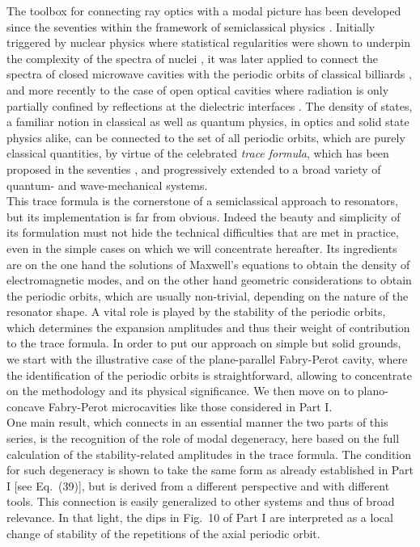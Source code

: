 \documentclass[10pt]{iopart}
\begin{document}
The toolbox for connecting ray optics with a modal picture has been developed since the seventies within the framework of semiclassical physics \cite{brack}. Initially triggered by nuclear physics where statistical regularities were shown to underpin the complexity of the spectra of nuclei \cite{bohigas}, it was later applied to connect the spectra of closed microwave cavities with the periodic orbits of classical billiards \cite{graf1992}, and more recently to the case of open optical cavities where radiation is only partially confined by reflections at the dielectric interfaces \cite{PRE-trace}.
The density of states, a familiar notion in classical as well as quantum physics, in optics and solid state physics alike, can be connected to the set of all periodic orbits, which are purely classical quantities, by virtue of the celebrated \emph{trace formula}, which has been proposed in the seventies \cite{balian,gutzwiller}, and progressively extended to a broad variety of quantum- and wave-mechanical systems.\\

This trace formula is the cornerstone of a semiclassical approach to resonators, but its implementation is far from obvious. Indeed the beauty and simplicity of its formulation must not hide the technical difficulties that are met in practice, even in the simple cases on which we will concentrate hereafter. Its ingredients are on the one hand the solutions of Maxwell's equations to obtain the density of electromagnetic modes, and on the other hand geometric considerations to obtain the periodic orbits, which are usually non-trivial, depending on the nature of the resonator shape. A vital role is played by the stability of the periodic orbits, which determines the expansion amplitudes and thus their weight of contribution to the trace formula. In order to put our approach on simple but solid grounds, we start with the illustrative case of the plane-parallel Fabry-Perot cavity, where the identification of the periodic orbits is straightforward, allowing to concentrate on the methodology and its physical significance. We then move on to plano-concave Fabry-Perot microcavities like those considered in Part I.\\

One main result, which connects in an essential manner the two parts of this series, is the recognition of the role of modal degeneracy, here based on the full calculation of the stability-related amplitudes in the trace formula. The condition for such degeneracy is shown to take the same form as already established in Part I [see Eq.~(39)], but is derived from a different perspective and with different tools. This connection is easily generalized to other systems and thus of broad relevance. In that light, the dips in Fig.~10 of Part I are interpreted as a local change of stability of the repetitions of the axial periodic orbit. \\
\end{document}
